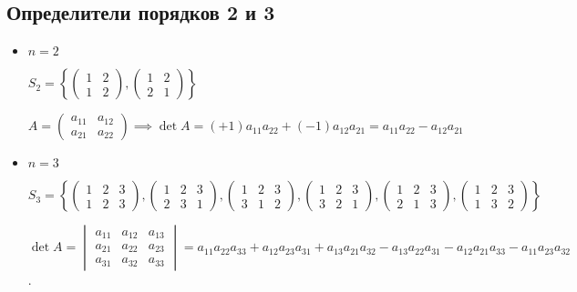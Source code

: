 \subsection{Определители порядков 2 и 3}
\begin{itemize}
\item
    $n = 2$

    $S_2 = \left\{ \begin{pmatrix} 1 & 2 \\ 1 & 2 \end{pmatrix}, \begin{pmatrix} 1 & 2 \\ 2 & 1 \end{pmatrix} \right\}$

    $A = \begin{pmatrix} a_{11} & a_{12} \\ a_{21} & a_{22} \end{pmatrix} \implies \det A = (+1) a_{11} a_{22} + (-1) a_{12} a_{21} = a_{11} a_{22} - a_{12} a_{21}$

\item
    $n = 3$

    $S_3 = \left\{
    \begin{pmatrix} 1 & 2 & 3 \\ 1 & 2 & 3 \end{pmatrix},
    \begin{pmatrix} 1 & 2 & 3 \\ 2 & 3 & 1 \end{pmatrix},
    \begin{pmatrix} 1 & 2 & 3 \\ 3 & 1 & 2 \end{pmatrix},
    \begin{pmatrix} 1 & 2 & 3 \\ 3 & 2 & 1 \end{pmatrix},
    \begin{pmatrix} 1 & 2 & 3 \\ 2 & 1 & 3 \end{pmatrix},
    \begin{pmatrix} 1 & 2 & 3 \\ 1 & 3 & 2 \end{pmatrix} \right\}$

    $\det A = \begin{vmatrix} a_{11} & a_{12} & a_{13} \\ a_{21} & a_{22} & a_{23} \\ a_{31} & a_{32} & a_{33} \end{vmatrix} = a_{11} a_{22} a_{33} + a_{12} a_{23} a_{31} + a_{13} a_{21} a_{32} - a_{13} a_{22} a_{31} - a_{12} a_{21} a_{33} - a_{11} a_{23} a_{32}$.
\end{itemize}
